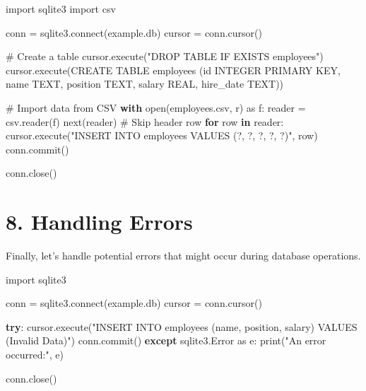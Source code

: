 \documentclass[
  letterpaper,
  DIV=11,
  numbers=noendperiod]{scrreprt}
\newenvironment{Shaded}{\begin{snugshade}}{\end{snugshade}}
\newcommand{\BuiltInTok}[1]{\textcolor[rgb]{0.00,0.23,0.31}{#1}}
\newcommand{\CommentTok}[1]{\textcolor[rgb]{0.37,0.37,0.37}{#1}}
\newcommand{\ControlFlowTok}[1]{\textcolor[rgb]{0.00,0.23,0.31}{\textbf{#1}}}
\newcommand{\ExtensionTok}[1]{\textcolor[rgb]{0.00,0.23,0.31}{#1}}
\newcommand{\ImportTok}[1]{\textcolor[rgb]{0.00,0.46,0.62}{#1}}
\newcommand{\KeywordTok}[1]{\textcolor[rgb]{0.00,0.23,0.31}{\textbf{#1}}}
\newcommand{\NormalTok}[1]{\textcolor[rgb]{0.00,0.23,0.31}{#1}}
\newcommand{\OperatorTok}[1]{\textcolor[rgb]{0.37,0.37,0.37}{#1}}
\newcommand{\StringTok}[1]{\textcolor[rgb]{0.13,0.47,0.30}{#1}}
\begin{document}
\begin{Shaded}
\begin{Highlighting}[]
\ImportTok{import}\NormalTok{ sqlite3}
\ImportTok{import}\NormalTok{ csv}

\NormalTok{conn }\OperatorTok{=}\NormalTok{ sqlite3.}\ExtensionTok{connect}\NormalTok{(}\StringTok{\textquotesingle{}example.db\textquotesingle{}}\NormalTok{)}
\NormalTok{cursor }\OperatorTok{=}\NormalTok{ conn.cursor()}

\CommentTok{\# Create a table}
\NormalTok{cursor.execute(}\StringTok{"DROP TABLE IF EXISTS employees"}\NormalTok{)}
\NormalTok{cursor.execute(}\StringTok{\textquotesingle{}\textquotesingle{}\textquotesingle{}CREATE TABLE employees}
\StringTok{                  (id INTEGER PRIMARY KEY, name TEXT, position TEXT, salary REAL, hire\_date TEXT)\textquotesingle{}\textquotesingle{}\textquotesingle{}}\NormalTok{)}

\CommentTok{\# Import data from CSV}
\ControlFlowTok{with} \BuiltInTok{open}\NormalTok{(}\StringTok{\textquotesingle{}employees.csv\textquotesingle{}}\NormalTok{, }\StringTok{\textquotesingle{}r\textquotesingle{}}\NormalTok{) }\ImportTok{as}\NormalTok{ f:}
\NormalTok{    reader }\OperatorTok{=}\NormalTok{ csv.reader(f)}
    \BuiltInTok{next}\NormalTok{(reader)  }\CommentTok{\# Skip header row}
    \ControlFlowTok{for}\NormalTok{ row }\KeywordTok{in}\NormalTok{ reader:}
\NormalTok{        cursor.execute(}\StringTok{"INSERT INTO employees VALUES (?, ?, ?, ?, ?)"}\NormalTok{, row)}
\NormalTok{conn.commit()}

\NormalTok{conn.close()}
\end{Highlighting}
\end{Shaded}

\section{8. Handling Errors}\label{handling-errors}

Finally, let's handle potential errors that might occur during database
operations.

\begin{Shaded}
\begin{Highlighting}[]
\ImportTok{import}\NormalTok{ sqlite3}

\NormalTok{conn }\OperatorTok{=}\NormalTok{ sqlite3.}\ExtensionTok{connect}\NormalTok{(}\StringTok{\textquotesingle{}example.db\textquotesingle{}}\NormalTok{)}
\NormalTok{cursor }\OperatorTok{=}\NormalTok{ conn.cursor()}

\ControlFlowTok{try}\NormalTok{:}
\NormalTok{    cursor.execute(}\StringTok{"INSERT INTO employees (name, position, salary) VALUES (\textquotesingle{}Invalid Data\textquotesingle{})"}\NormalTok{)}
\NormalTok{    conn.commit()}
\ControlFlowTok{except}\NormalTok{ sqlite3.Error }\ImportTok{as}\NormalTok{ e:}
    \BuiltInTok{print}\NormalTok{(}\StringTok{"An error occurred:"}\NormalTok{, e)}

\NormalTok{conn.close()}
\end{Highlighting}
\end{Shaded}
\end{document}
